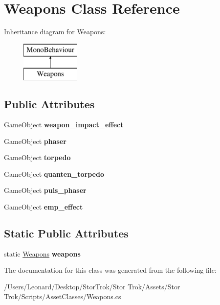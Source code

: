 \hypertarget{class_weapons}{}\section{Weapons Class Reference}
\label{class_weapons}
Inheritance diagram for Weapons\+:\begin{figure}[H]
\begin{center}
\leavevmode
\includegraphics[height=2.000000cm]{class_weapons}
\end{center}
\end{figure}
\subsection*{Public Attributes}
\begin{DoxyCompactItemize}
\item 
\mbox{\label{class_weapons_a59ce8e4739e54849f6548534624afe51}} 
Game\+Object {\bfseries weapon\+\_\+impact\+\_\+effect}
\item 
\mbox{\label{class_weapons_abc7c79c143909f61e92c704fc525ed21}} 
Game\+Object {\bfseries phaser}
\item 
\mbox{\label{class_weapons_a05c6a917a43eb97e46d9d5ff86cb3cf2}} 
Game\+Object {\bfseries torpedo}
\item 
\mbox{\label{class_weapons_a9f7ab08e3fb99cc3e26c9d705e4b6619}} 
Game\+Object {\bfseries quanten\+\_\+torpedo}
\item 
\mbox{\label{class_weapons_a66cd5b5ce7b99dae17c3a0c622d439e6}} 
Game\+Object {\bfseries puls\+\_\+phaser}
\item 
\mbox{\label{class_weapons_a22321b88980d9096c183bf1535bf4d39}} 
Game\+Object {\bfseries emp\+\_\+effect}
\end{DoxyCompactItemize}
\subsection*{Static Public Attributes}
\begin{DoxyCompactItemize}
\item 
\mbox{\label{class_weapons_af8e0079b36707d2cb81920911a5807c4}} 
static \hyperlink{class_weapons}{Weapons} {\bfseries weapons}
\end{DoxyCompactItemize}


The documentation for this class was generated from the following file\+:\begin{DoxyCompactItemize}
\item 
/\+Users/\+Leonard/\+Desktop/\+Stor\+Trok/\+Stor Trok/\+Assets/\+Stor Trok/\+Scripts/\+Asset\+Classes/Weapons.\+cs\end{DoxyCompactItemize}
